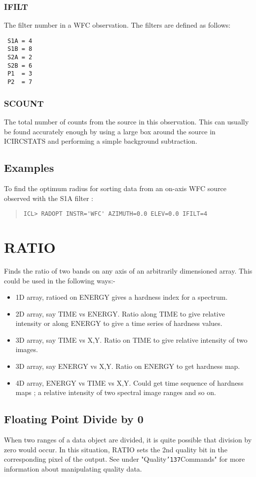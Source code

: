 \documentclass{book}
\renewcommand{\_}{{\tt\char'137}}     %
\begin{document}
\subsubsection{IFILT}
The filter number in a WFC observation. The filters are defined
as follows:
 
\begin{verbatim}
 S1A = 4
 S1B = 8
 S2A = 2
 S2B = 6
 P1  = 3
 P2  = 7
\end{verbatim}
\subsubsection{SCOUNT}
The total number of counts from the source in this observation.
This can usually be found accurately enough by using a large box
around the source in ICIRCSTATS and performing a simple background
subtraction.
 
\subsection{Examples}
To find the optimum radius for sorting data from an on-axis WFC source
observed with the S1A filter :
\begin{quote}\begin{verbatim}
ICL> RADOPT INSTR='WFC' AZIMUTH=0.0 ELEV=0.0 IFILT=4
\end{verbatim}\end{quote}
\section{RATIO}
Finds the ratio of two bands on any axis of an arbitrarily
dimensioned array. This could be used in the following ways:-
\begin{itemize}
\item 1D array, ratioed on ENERGY gives a hardness index for a
spectrum.
\item 2D array, say TIME vs ENERGY. Ratio along TIME to give
relative intensity or along ENERGY to give a time series
of hardness values.
\item 3D array, say TIME vs X,Y. Ratio on TIME to give
relative intensity of two images.
\item 3D array, say ENERGY vs X,Y. Ratio on ENERGY to get
hardness map.
\item 4D array, ENERGY vs TIME vs X,Y. Could get time sequence
of hardness maps ; a relative intensity of two spectral
image ranges and so on.
\end{itemize}
\subsection{Floating Point Divide by 0}
When two ranges of a data object are divided, it is quite
possible that division by zero would occur. In this situation,
RATIO sets the 2nd quality bit in the corresponding pixel of
the output. See under "Quality\_Commands" for more information
about manipulating quality data.
 
\end{document}
